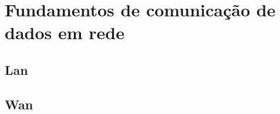 \section{Fundamentos de comunicação de dados em rede}
\lipsum[1]

	\subsection{Lan}
	\lipsum[1]
	
	\subsection{Wan}
	\lipsum[1]